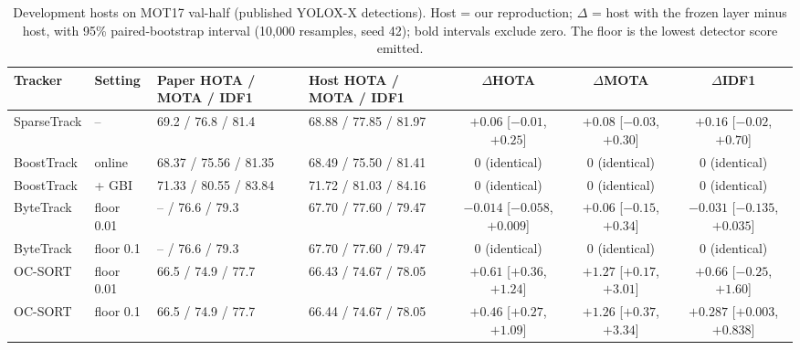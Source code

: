 \begin{table}
\centering
\caption{Development hosts on MOT17 val-half (published YOLOX-X detections). Host = our reproduction; $\Delta$ = host with the frozen layer minus host, with 95\% paired-bootstrap interval (10,000 resamples, seed 42); bold intervals exclude zero. The floor is the lowest detector score emitted.}
\label{tab:ch5-mot17}
\small\setlength{\tabcolsep}{4pt}
\begin{adjustbox}{max width=\textheight}
\begin{tabular}{llllccc}
\hline
Tracker & Setting & Paper HOTA / MOTA / IDF1 & Host HOTA / MOTA / IDF1 & $\Delta$HOTA & $\Delta$MOTA & $\Delta$IDF1 \\
\hline
SparseTrack & -- & 69.2 / 76.8 / 81.4 & 68.88 / 77.85 / 81.97 & $+0.06$ [$-0.01$, $+0.25$] & $+0.08$ [$-0.03$, $+0.30$] & $+0.16$ [$-0.02$, $+0.70$] \\
BoostTrack & online & 68.37 / 75.56 / 81.35 & 68.49 / 75.50 / 81.41 & 0 (identical) & 0 (identical) & 0 (identical) \\
BoostTrack & + GBI & 71.33 / 80.55 / 83.84 & 71.72 / 81.03 / 84.16 & 0 (identical) & 0 (identical) & 0 (identical) \\
ByteTrack & floor 0.01 & -- / 76.6 / 79.3 & 67.70 / 77.60 / 79.47 & $-0.014$ [$-0.058$, $+0.009$] & $+0.06$ [$-0.15$, $+0.34$] & $-0.031$ [$-0.135$, $+0.035$] \\
ByteTrack & floor 0.1 & -- / 76.6 / 79.3 & 67.70 / 77.60 / 79.47 & 0 (identical) & 0 (identical) & 0 (identical) \\
OC-SORT & floor 0.01 & 66.5 / 74.9 / 77.7 & 66.43 / 74.67 / 78.05 & {\boldmath $+0.61$ [$+0.36$, $+1.24$]} & {\boldmath $+1.27$ [$+0.17$, $+3.01$]} & $+0.66$ [$-0.25$, $+1.60$] \\
OC-SORT & floor 0.1 & 66.5 / 74.9 / 77.7 & 66.44 / 74.67 / 78.05 & {\boldmath $+0.46$ [$+0.27$, $+1.09$]} & {\boldmath $+1.26$ [$+0.37$, $+3.34$]} & {\boldmath $+0.287$ [$+0.003$, $+0.838$]} \\
\hline
\end{tabular}
\end{adjustbox}
\end{table}
